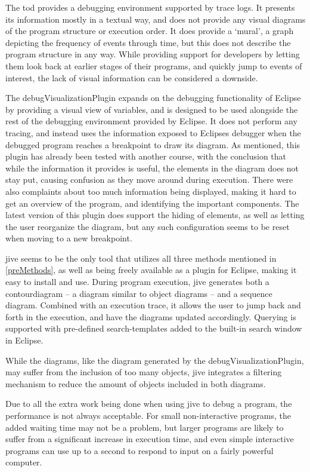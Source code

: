 The \gls{tod} provides a debugging environment supported by trace logs.
It presents its information mostly in a textual way, and does not provide any visual diagrams of the program structure or execution order.
It does provide a `mural', a graph depicting the frequency of events through time, but this does not describe the program structure in any way.
While providing support for developers by letting them look back at earlier stages of their programs, and quickly jump to events of interest, the lack of visual information can be considered a downside.

The \gls{debugVisualizationPlugin} expands on the debugging functionality of Eclipse by providing a visual view of variables, and is designed to be used alongside the rest of the debugging environment provided by Eclipse.
It does not perform any tracing, and instead uses the information exposed to Eclipses debugger when the debugged program reaches a breakpoint to draw its diagram.
As mentioned, this plugin has already been tested with another course, with the conclusion that while the information it provides is useful, the elements in the diagram does not stay put, causing confusion as they move around during execution.
There were also complaints about too much information being displayed, making it hard to get an overview of the program, and identifying the important components.
The latest version of this plugin does support the hiding of elements, as well as letting the user reorganize the diagram, but any such configuration seems to be reset when moving to a new breakpoint.

\Gls{jive} seems to be the only tool that utilizes all three methods mentioned in \cref{preMethods}, as well as being freely available as a plugin for Eclipse, making it easy to install and use.
During program execution, \gls{jive} generates both a \gls{contourdiagram} \cite{Jayaraman1996} -- a diagram similar to object diagrams -- and a sequence diagram.
Combined with an execution trace, it allows the user to jump back and forth in the execution, and have the diagrams updated accordingly.
Querying is supported with pre-defined search-templates added to the built-in search window in Eclipse.

While the diagrams, like the diagram generated by the \gls{debugVisualizationPlugin}, may suffer from the inclusion of too many objects, \gls{jive} integrates a filtering mechanism to reduce the amount of objects included in both diagrams.

Due to all the extra work being done when using \gls{jive} to debug a program, the performance is not always acceptable.
For small non-interactive programs, the added waiting time may not be a problem, but larger programs are likely to suffer from a significant increase in execution time, and even simple interactive programs can use up to a second to respond to input on a fairly powerful computer.






